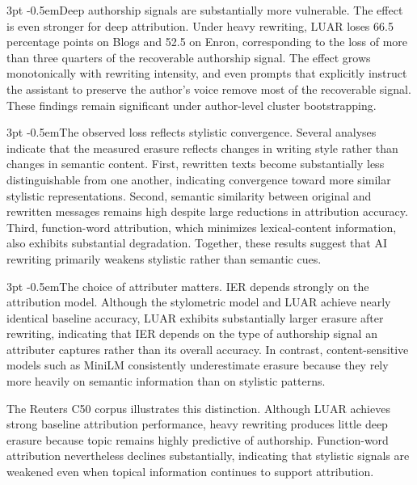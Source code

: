 \documentclass[sigconf,nonacm]{acmart}
\makeatletter
\renewcommand\paragraph{\@startsection{paragraph}{4}{\z@}%
  {3pt \@plus 1pt \@minus 1pt}{-0.5em}{\normalfont\normalsize\bfseries}}
\makeatother
\begin{document}
\paragraph{Deep authorship signals are substantially more vulnerable.}
The effect is even stronger for deep attribution. Under heavy rewriting, LUAR loses
66.5 percentage points on Blogs and 52.5 on Enron, corresponding to the loss of
more than three quarters of the recoverable authorship signal. The effect grows
monotonically with rewriting intensity, and even prompts that explicitly instruct
the assistant to preserve the author's voice remove most of the recoverable signal.
These findings remain significant under author-level cluster bootstrapping.

\paragraph{The observed loss reflects stylistic convergence.}
Several analyses indicate that the measured erasure reflects changes in writing
style rather than changes in semantic content. First, rewritten texts become
substantially less distinguishable from one another, indicating convergence toward
more similar stylistic representations. Second, semantic similarity between original
and rewritten messages remains high despite large reductions in attribution
accuracy. Third, function-word attribution, which minimizes lexical-content
information, also exhibits substantial degradation. Together, these results suggest
that AI rewriting primarily weakens stylistic rather than semantic cues.

\paragraph{The choice of attributer matters.}
IER depends strongly on the attribution model. Although the stylometric model and
LUAR achieve nearly identical baseline accuracy, LUAR exhibits substantially larger
erasure after rewriting, indicating that IER depends on the type of authorship
signal an attributer captures rather than its overall accuracy. In contrast,
content-sensitive models such as MiniLM consistently underestimate erasure because
they rely more heavily on semantic information than on stylistic patterns.

The Reuters C50 corpus illustrates this distinction. Although LUAR achieves strong
baseline attribution performance, heavy rewriting produces little deep erasure
because topic remains highly predictive of authorship. Function-word attribution
nevertheless declines substantially, indicating that stylistic signals are weakened
even when topical information continues to support attribution.
\end{document}
